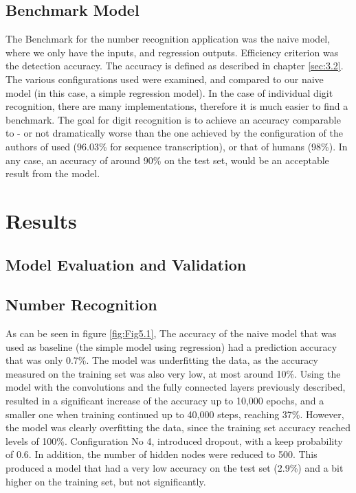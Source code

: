 \documentclass[final,12p,times]{elsarticle}
\begin{document}
\begin{Itemize}
\subsection{Benchmark Model}
\label{sec:4.3}
The Benchmark for the number recognition application was the naive model, where we only have the inputs, and regression outputs.
Efficiency criterion was the detection accuracy.
The accuracy is defined as described in chapter \ref{sec:3.2}.
The various configurations used were examined, and compared to our naive model (in this case, a simple regression model).
In the case of individual digit recognition, there are many implementations, therefore it is much easier to find a benchmark.
The goal for digit recognition is to achieve an accuracy comparable to - or not dramatically worse than
the one achieved by the configuration of the authors of \cite{DBLP:journals/corr/GoodfellowBIAS13} used (96.03\% for sequence transcription), 
or that of humans (98\%).
In any case, an accuracy of around 90\% on the test set, would be an acceptable result from the model.


 
\section{Results}
\label{sec:5}
\subsection{Model Evaluation and Validation}
\label{sec:5.1}
\subsection{Number Recognition}
\label{sec:5.1.1}
As can be seen in figure \ref{fig:Fig5.1}, The accuracy of the naive model that was used as baseline (the simple model using regression) 
had a prediction accuracy that was only 0.7\%.
The model was underfitting the data, as the accuracy measured on the training set was also very low, at most around 10\%.
Using the model with the convolutions and the fully connected layers previously described, resulted in a significant increase of the accuracy up to 10,000 epochs, 
and a smaller one when training continued up to 40,000 steps, reaching 37\%.
However, the model was clearly overfitting the data, since the training set accuracy reached levels of 100\%.
Configuration No 4, introduced dropout, with a keep probability of 0.6.
In addition, the number of hidden nodes were reduced to 500.
This produced a model that had a very low accuracy on the test set (2.9\%) and a bit higher on the training set, but not significantly.


\end{Itemize}
\end{document}

